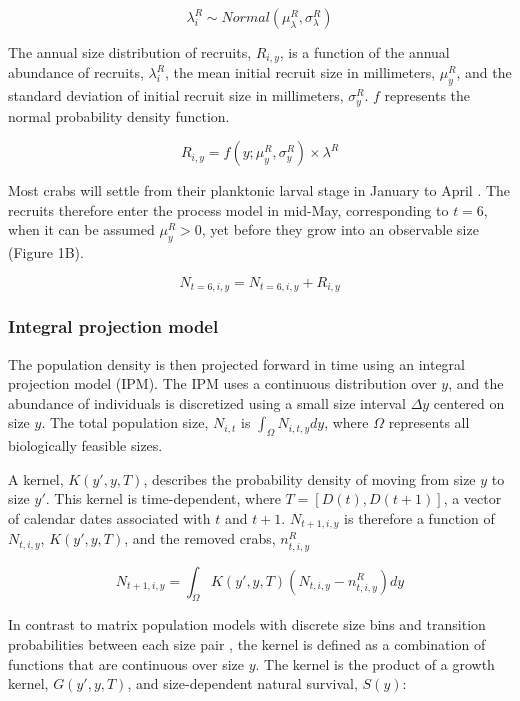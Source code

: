 \documentclass{article}
\begin{document}
\begin{equation}
\lambda^R_i \sim Normal(\mu^R_{\lambda}, \sigma^R_{\lambda})
\end{equation}

The annual size distribution of recruits, $R_{i, y}$, is a function of the annual abundance of recruits, $\lambda^R_i$, the mean initial recruit size in millimeters, $\mu^R_y$, and the standard deviation of initial recruit size in millimeters, $\sigma^R_y$. $f$ represents the normal probability density function.

\begin{equation}
R_{i, y} = f(y; \mu^R_{y}, \sigma^R_{y}) \times \lambda^R
\end{equation}

Most crabs will settle from their planktonic larval stage in January to April \parencite{yamada2005growth}. The recruits therefore enter the process model in mid-May, corresponding to $t=6$, when it can be assumed $\mu^R_y > 0$, yet before they grow into an observable size (Figure 1B).

\begin{equation}
N_{t=6, i, y} =  N_{t=6, i, y} + R_{i, y}
\end{equation}

\subsubsection*{Integral projection model}

The population density is then projected forward in time using an integral projection model (IPM). The IPM uses a continuous distribution over $y$, and the abundance of individuals is discretized using a small size interval $\Delta y$ centered on size $y$. The total population size, $N_{i,t}$ is $\int_{\Omega} N_{i,t,y} dy$, where $\Omega$ represents all biologically feasible sizes.

A kernel, $K(y', y, T)$, describes the probability density of moving from size $y$ to size $y'$. This kernel is time-dependent, where $T = [D(t), D(t+1)]$, a vector of calendar dates associated with $t$ and $t+1$. $N_{t+1,i,y}$ is therefore a function of $N_{t,i,y}$, $K(y', y, T)$, and the removed crabs, $n^R_{t,i,y}$

\begin{equation}
N_{t+1,i,y} = \int_{\Omega} K(y',y, T) (N_{t,i,y} - n^R_{t,i,y}) dy 
\end{equation}

In contrast to matrix population models with discrete size bins and transition probabilities between each size pair \parencite{caswell2001matrix}, the kernel is defined as a combination of functions that are continuous over size $y$. The kernel is the product of a growth kernel, $G(y',y, T)$, and size-dependent natural survival, $S(y)$:
\end{document}
